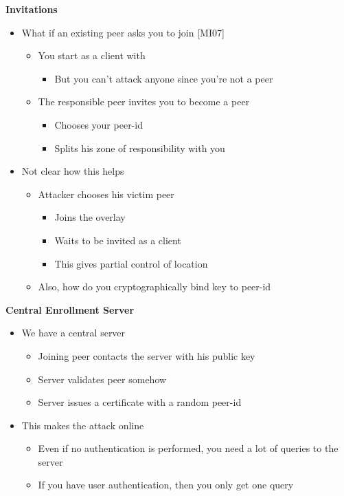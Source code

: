 \documentclass[helvetica]{seminar}
\newcommand{\heading}[1]{%
  \begin{center} 
    \large\bf 
    #1 
  \end{center} 
  \vspace{.4 in}}
\begin{document}
\begin{slide}
\heading{Invitations}

\vspace{-.2 in}
\begin{itemize}
\item What if an existing peer asks you to join [MI07]
\begin{itemize}
\item You start as a client with
\begin{itemize}
\item But you can't attack anyone since you're not a peer
\end{itemize}
\item The responsible peer invites you to become a peer
\begin{itemize}
\item Chooses your peer-id
\item Splits his zone of responsibility with you
\end{itemize}
\end{itemize}
\item Not clear how this helps
\begin{itemize}
\item Attacker chooses his victim peer
\begin{itemize}
\item Joins the overlay
\item Waits to be invited as a client
\item This gives partial control of location
\end{itemize}
\item Also, how do you cryptographically bind key to peer-id
\end{itemize}
\end{itemize}

\end{slide}



\begin{slide}
\heading{Central Enrollment Server}

\begin{itemize}
\item We have a central server
\begin{itemize}
\item Joining peer contacts the server with his public key
\item Server validates peer somehow
\item Server issues a certificate with a random peer-id
\end{itemize}
\item This makes the attack online
\begin{itemize}
\item Even if no authentication is performed, you need a lot of queries to the server
\item If you have user authentication, then you only get one query
\end{itemize}
\end{itemize}

\end{slide}
\end{document}
